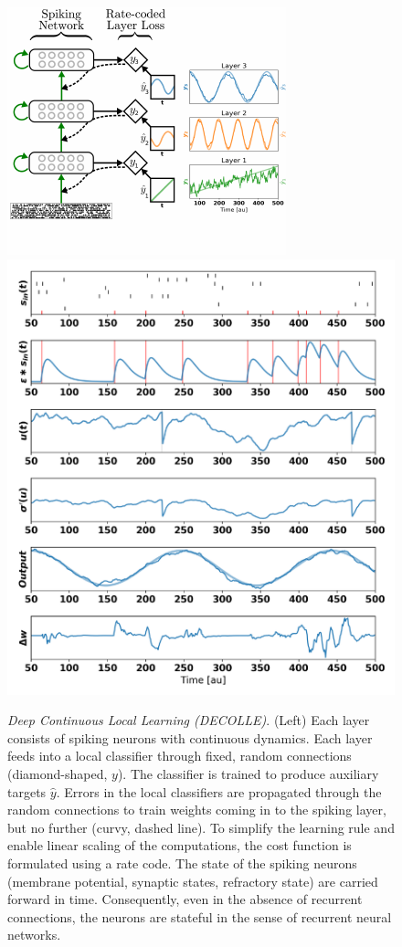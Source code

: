 \documentclass[english]{article}
\begin{document}
\begin{figure}
\begin{center}
  \includegraphics[height=.32\textheight]{img/synthetic_illustration}
  \hspace{.05\textwidth}
  \includegraphics[height=.32\textheight]{img/snapshot}
\end{center}
  \caption{\label{fig:dcll_illustration}\emph{Deep Continuous Local Learning (DECOLLE)}. (Left) Each layer consists of spiking neurons with continuous dynamics. Each layer feeds into a local classifier through fixed, random connections (diamond-shaped, $y$). The classifier is trained to produce auxiliary targets $\hat{y}$. Errors in the local classifiers are propagated through the random connections to train weights coming in to the spiking layer, but no further (curvy, dashed line). To simplify the learning rule and enable linear scaling of the computations, the cost function is formulated using a rate code. The state of the spiking neurons (membrane potential, synaptic states, refractory state) are carried forward in time. Consequently, even in the absence of recurrent connections, the neurons are stateful in the sense of recurrent neural networks.
}
\end{figure}
\end{document}
